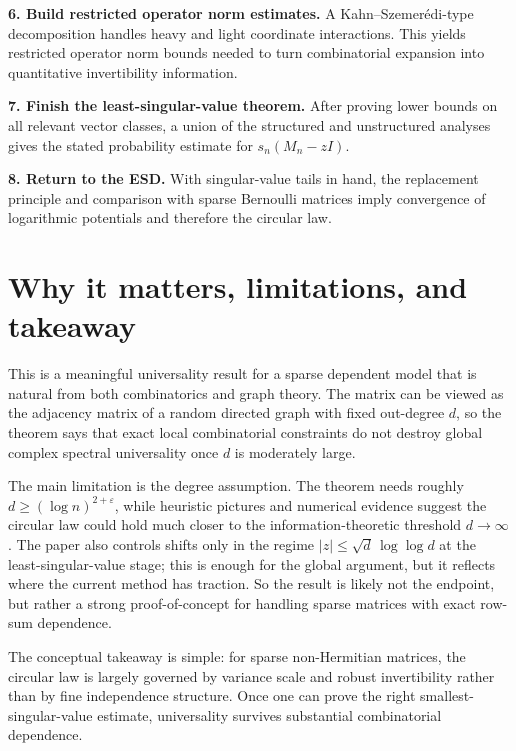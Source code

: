 \documentclass[11pt]{article}
\begin{document}
\textbf{6. Build restricted operator norm estimates.} A Kahn--Szemer\'edi-type decomposition handles heavy and light coordinate interactions. This yields restricted operator norm bounds needed to turn combinatorial expansion into quantitative invertibility information.

\textbf{7. Finish the least-singular-value theorem.} After proving lower bounds on all relevant vector classes, a union of the structured and unstructured analyses gives the stated probability estimate for $s_n(M_n-zI)$.

\textbf{8. Return to the ESD.} With singular-value tails in hand, the replacement principle and comparison with sparse Bernoulli matrices imply convergence of logarithmic potentials and therefore the circular law.

\section*{Why it matters, limitations, and takeaway}
This is a meaningful universality result for a sparse dependent model that is natural from both combinatorics and graph theory. The matrix can be viewed as the adjacency matrix of a random directed graph with fixed out-degree $d$, so the theorem says that exact local combinatorial constraints do not destroy global complex spectral universality once $d$ is moderately large.

The main limitation is the degree assumption. The theorem needs roughly $d\ge (\log n)^{2+\varepsilon}$, while heuristic pictures and numerical evidence suggest the circular law could hold much closer to the information-theoretic threshold $d\to\infty$. The paper also controls shifts only in the regime $|z|\le \sqrt d\,\log\log d$ at the least-singular-value stage; this is enough for the global argument, but it reflects where the current method has traction. So the result is likely not the endpoint, but rather a strong proof-of-concept for handling sparse matrices with exact row-sum dependence.

The conceptual takeaway is simple: for sparse non-Hermitian matrices, the circular law is largely governed by variance scale and robust invertibility rather than by fine independence structure. Once one can prove the right smallest-singular-value estimate, universality survives substantial combinatorial dependence.
\end{document}
